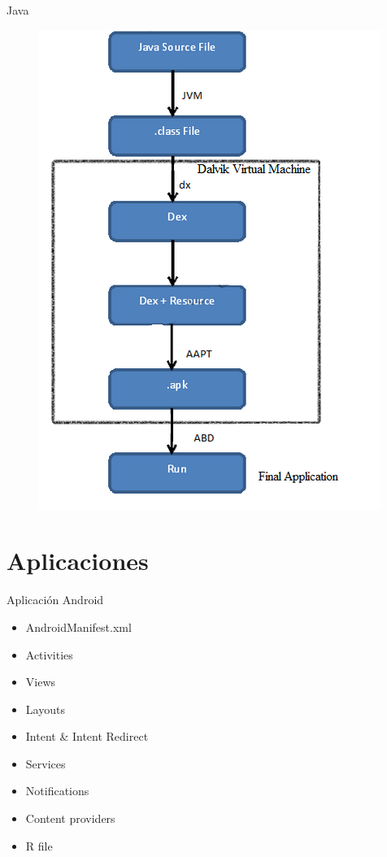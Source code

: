 \documentclass{beamer}
\begin{document}
\begin{frame}{Java}
    \begin{figure}
        \centering
        \includegraphics[width=0.55\linewidth]{Images/javatodalvik}
    \end{figure}
\end{frame}


\section{Aplicaciones}
\begin{frame}{Aplicación Android}
    \begin{itemize}
        \item AndroidManifest.xml
        \item Activities
        \item Views
        \item Layouts
        \item Intent \& Intent Redirect
        \item Services
        \item Notifications
        \item Content providers
        \item R file
    \end{itemize}
\end{frame}
\end{document}
